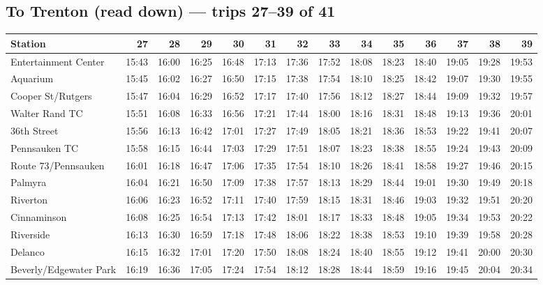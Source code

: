 \subsection*{To Trenton (read down) --- trips 27--39 of 41}
\begin{center}\footnotesize\setlength{\tabcolsep}{3pt}\begin{tabular}{@{}lrrrrrrrrrrrrr@{}}\toprule
Station & 27 & 28 & 29 & 30 & 31 & 32 & 33 & 34 & 35 & 36 & 37 & 38 & 39 \\\midrule
Entertainment Center & 15:43 & 16:00 & 16:25 & 16:48 & 17:13 & 17:36 & 17:52 & 18:08 & 18:23 & 18:40 & 19:05 & 19:28 & 19:53 \\
Aquarium & 15:45 & 16:02 & 16:27 & 16:50 & 17:15 & 17:38 & 17:54 & 18:10 & 18:25 & 18:42 & 19:07 & 19:30 & 19:55 \\
Cooper St/Rutgers & 15:47 & 16:04 & 16:29 & 16:52 & 17:17 & 17:40 & 17:56 & 18:12 & 18:27 & 18:44 & 19:09 & 19:32 & 19:57 \\
Walter Rand TC & 15:51 & 16:08 & 16:33 & 16:56 & 17:21 & 17:44 & 18:00 & 18:16 & 18:31 & 18:48 & 19:13 & 19:36 & 20:01 \\
36th Street & 15:56 & 16:13 & 16:42 & 17:01 & 17:27 & 17:49 & 18:05 & 18:21 & 18:36 & 18:53 & 19:22 & 19:41 & 20:07 \\
Pennsauken TC & 15:58 & 16:15 & 16:44 & 17:03 & 17:29 & 17:51 & 18:07 & 18:23 & 18:38 & 18:55 & 19:24 & 19:43 & 20:09 \\
Route 73/Pennsauken & 16:01 & 16:18 & 16:47 & 17:06 & 17:35 & 17:54 & 18:10 & 18:26 & 18:41 & 18:58 & 19:27 & 19:46 & 20:15 \\
Palmyra & 16:04 & 16:21 & 16:50 & 17:09 & 17:38 & 17:57 & 18:13 & 18:29 & 18:44 & 19:01 & 19:30 & 19:49 & 20:18 \\
Riverton & 16:06 & 16:23 & 16:52 & 17:11 & 17:40 & 17:59 & 18:15 & 18:31 & 18:46 & 19:03 & 19:32 & 19:51 & 20:20 \\
Cinnaminson & 16:08 & 16:25 & 16:54 & 17:13 & 17:42 & 18:01 & 18:17 & 18:33 & 18:48 & 19:05 & 19:34 & 19:53 & 20:22 \\
Riverside & 16:13 & 16:30 & 16:59 & 17:18 & 17:48 & 18:06 & 18:22 & 18:38 & 18:53 & 19:10 & 19:39 & 19:58 & 20:28 \\
Delanco & 16:15 & 16:32 & 17:01 & 17:20 & 17:50 & 18:08 & 18:24 & 18:40 & 18:55 & 19:12 & 19:41 & 20:00 & 20:30 \\
Beverly/Edgewater Park & 16:19 & 16:36 & 17:05 & 17:24 & 17:54 & 18:12 & 18:28 & 18:44 & 18:59 & 19:16 & 19:45 & 20:04 & 20:34 \\

\end{tabular}
\end{center}
